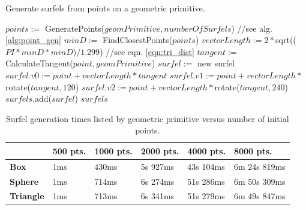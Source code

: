\begin{algorithm}[H]
\captionfont
\caption[Surfel generation]{Generate surfels from points on a geometric primitive.}
\label{alg:surfel_gen}
{\fontsize{10}{9}\selectfont
\begin{algorithmic}
      \State $points :=$ GeneratePoints($geomPrimitive, numberOfSurfels$) //see alg. \ref{alg:point_gen}
      \State $minD :=$ FindClosestPoints($points$)
      \State $vectorLength := 2 * $sqrt(($PI * minD * minD$)$ / 1.299$) //see eqn. \ref{eqn:tri_dist}
         \State $tangent :=$ CalculateTangent($point, geomPrimitive$)
         \State $surfel :=$ new surfel
         \State $surfel.v0 := point + vectorLength * tangent$
         \State $surfel.v1 := point + vectorLength * $rotate($tangent, 120$)
         \State $surfel.v2 := point + vectorLength * $rotate($tangent, 240$)
         \State $surfels$.add($surfel$)
      \EndFor
      \State \Return $surfels$
   \EndFunction
\end{algorithmic}
}
\end{algorithm}

\vfill
\begin{table}[h!]
   \centering
   \begin{tabular}{ | l | l | l | l | l | l | }
   \hline
   & \textbf{500 pts.} & \textbf{1000 pts.} & \textbf{2000 pts.} & \textbf{4000 pts.} & \textbf{8000 pts.} \\ \hline
   \textbf{Box} & 1ms & 430ms & 5s 927ms & 43s 104ms & 6m 24s 819ms \\ \hline
   \textbf{Sphere} & 1ms & 714ms & 6s 274ms & 51s 286ms & 6m 50s 309ms \\ \hline
   \textbf{Triangle} & 1ms & 713ms & 6s 341ms & 51s 279ms & 6m 49s 847ms \\ \hline
   \end{tabular}
   \captionfonts
   \caption[Surfel generation times]{Surfel generation times listed by geometric primitive versus number of initial points.}
   \label{tbl:surf_gen_times}
\end{table}
\vfill
                        
